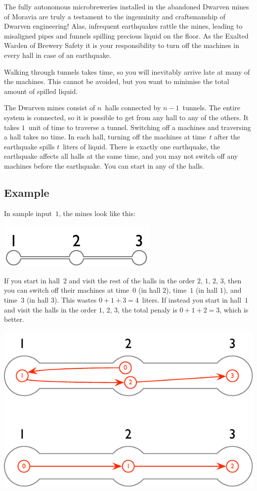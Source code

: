 
\noindent
The fully autonomous microbreweries installed in the abandoned Dwarven mines of Moravia are truly a testament to the ingenuinity and craftsmanship of Dwarven engineering!
Alas, infrequent earthquakes rattle the mines, leading to misaligned pipes and funnels spilling precious liquid on the floor.
As the Exalted Warden of Brewery Safety it is your responsibility to turn off the machines in every hall in case of an earthquake.

Walking through tunnels takes time, 
so you will inevitably arrive late at many of the machines.
This cannot be avoided, but you want to minimise the total amount of spilled liquid.

\medskip
The Dwarven mines consist of $n$~halls connected by $n-1$~tunnels.
The entire system is connected, so it is possible to get from any hall to any of the others.
It takes $1$~unit of time to traverse a tunnel.
Switching off a machines and traversing a hall takes no time.
In each hall, turning off the machines at time~$t$ after the earthquake spills $t$~liters of liquid.
There is exactly one earthquake, the earthquake affects all halls at the same time, and you may not switch off any machines before the earthquake.
You can start in any of the halls.

\subsection*{Example}

In sample input~$1$, the mines look like this:

\includegraphics[width=.2\textwidth]{img/sample-1.pdf}

If you start in hall~$2$ and visit the rest of the halls in the order $2$, $1$, $2$, $3$, then you can switch off their machines at time~$0$ (in hall $2$), time~$1$ (in hall $1$), and time~$3$ (in hall $3$).
This wastes $0+1+3=4$~liters.
If instead you start in hall~$1$ and visit the halls in the order $1$, $2$, $3$, the total penaly is $0+1+2=3$, which is better.

\includegraphics[width=.4\textwidth]{img/sample-1-ans.pdf}

